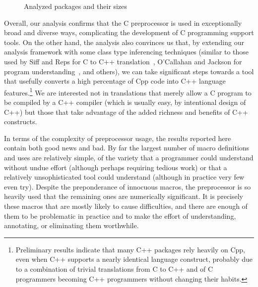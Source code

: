 \documentclass[11pt]{article}
\begin{document}
\begin{figure}
\centering
{\small
  \setlength{\tabcolsep}{.25em}
  
}
\caption{Analyzed packages and their sizes}
\label{fig:packages}
\end{figure}


Overall, our analysis confirms that the C preprocessor is used in
exceptionally broad and diverse ways, complicating the development of C
programming support tools.  On the other hand, the analysis also convinces
us that, by extending our analysis framework with some class type
inferencing techniques (similar to those used by Siff and Reps for C to C++
translation~\cite{Siff-fse96}, O'Callahan and Jackson for program
understanding~\cite{OCallahan-icse97}, and others), we can take significant
steps towards a tool that usefully converts a high percentage of Cpp code
into C++ language features.\footnote{Preliminary results indicate that many
  C++ packages rely heavily on Cpp, even when C++ supports a nearly
  identical language construct, probably due to a combination of trivial
  translations from C to C++ and of C programmers becoming C++ programmers
  without changing their habits.} We are interested not in translations
that merely allow a C program to be compiled by a C++ compiler (which is
usually easy, by intentional design of C++) but those that take advantage
of the added richness and benefits of C++ constructs.

In terms of the complexity of preprocessor usage, the results reported here
contain both good news and bad.  By far
the largest number of macro definitions and uses are relatively simple, of
the variety that a programmer could understand without undue effort (although
perhaps requiring tedious work) or that a relatively unsophisticated tool
could understand (although in practice very few even try).  Despite the
preponderance of innocuous macros, the preprocessor is so heavily used that
the remaining ones are numerically significant.  It is precisely these
macros that are mostly likely to cause difficulties, and there are enough
of them to be problematic in practice and to make the effort of
understanding, annotating, or eliminating them worthwhile.

\end{document}

